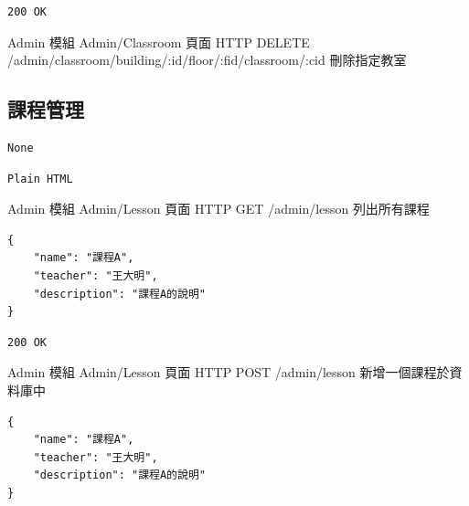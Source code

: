 \documentclass{article}
\begin{document}
\begin{lrbox}{\jsonoutputbox}
	\begin{lstlisting}
200 OK
\end{lstlisting}
\end{lrbox}

{Admin 模組}
{Admin/Classroom 頁面}
{HTTP DELETE}
{/admin/classroom/building/:id/floor/:fid/classroom/:cid}
{刪除指定教室}

\pagebreak

\subsection{課程管理}

\begin{lrbox}{\jsoninputbox}
	\begin{lstlisting}
None
\end{lstlisting}
\end{lrbox}

\begin{lrbox}{\jsonoutputbox}
	\begin{lstlisting}
Plain HTML
\end{lstlisting}
\end{lrbox}

{Admin 模組}
{Admin/Lesson 頁面}
{HTTP GET}
{/admin/lesson}
{列出所有課程}

\bigskip

\begin{lrbox}{\jsoninputbox}
	\begin{lstlisting}[basicstyle=\tiny\ttfamily]
{
	"name": "課程A",
	"teacher": "王大明",
	"description": "課程A的說明"
}
\end{lstlisting}
\end{lrbox}

\begin{lrbox}{\jsonoutputbox}
	\begin{lstlisting}
200 OK
\end{lstlisting}
\end{lrbox}

{Admin 模組}
{Admin/Lesson 頁面}
{HTTP POST}
{/admin/lesson}
{新增一個課程於資料庫中}

\bigskip

\begin{lrbox}{\jsoninputbox}
	\begin{lstlisting}[basicstyle=\tiny\ttfamily]
{
	"name": "課程A",
	"teacher": "王大明",
	"description": "課程A的說明"
}
\end{lstlisting}
\end{lrbox}
\end{document}
